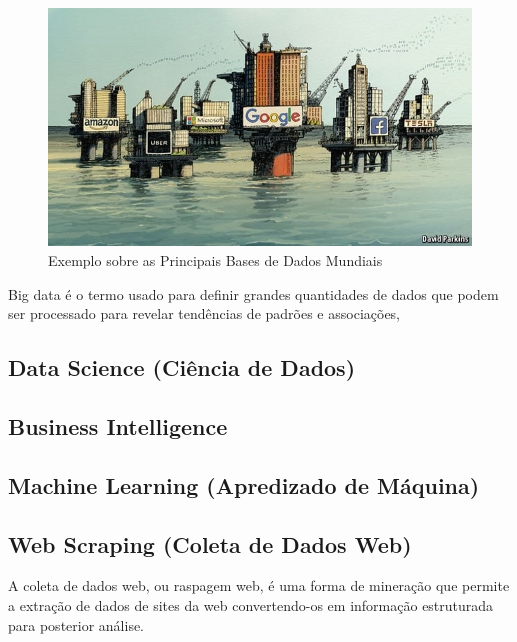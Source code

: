 \vspace{-1.0cm}
\begin{figure}
\centering
\includegraphics[scale=0.3]{figures/dados1.jpeg}
\caption{Exemplo sobre as Principais Bases de Dados Mundiais}
\label{fig:my_label8}
\end{figure}



Big data é o termo usado para definir grandes quantidades de dados que podem ser processado para revelar tendências de padrões e associações,

\subsection{Data Science (Ciência de Dados)}


\subsection{Business Intelligence}





\subsection{Machine Learning (Apredizado de Máquina)}




\subsection{Web Scraping (Coleta de Dados Web)}

A coleta de dados web, ou raspagem web, é uma forma de mineração que permite a extração de dados de sites da web convertendo-os em informação estruturada para posterior análise.

